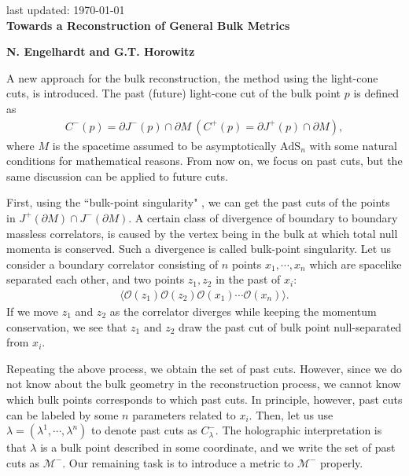 \documentclass[12pt]{article}
\date{}
\begin{document}
{\Large{}
\hfill{\normalsize last updated: \today}
\\[2mm]
\textbf{Towards a Reconstruction of General Bulk Metrics\cite{Engelhardt:2016wgb}
}
}

\noindent
\hfill
\textbf{N. Engelhardt and G.T. Horowitz}%

\vspace{12pt}
A new approach for the bulk reconstruction, the method using the light-cone cuts, is introduced.
The past (future) light-cone cut of the bulk point $p$ is defined as
\begin{align}
	C^-(p) = \partial J^-(p)\cap \partial M~(C^+(p) = \partial J^+(p)\cap \partial M),
\end{align}
where $M$ is the spacetime assumed to be asymptotically $\mathrm{AdS}_n$ with some natural conditions 
for mathematical reasons.
From now on, we focus on past cuts, but the same discussion can be applied to future cuts.

First, using the ``bulk-point singularity" \cite{Maldacena:2015iua}, we can get the past cuts of the points 
in $J^+(\partial M)\cap J^-(\partial M)$.
A certain class of divergence of boundary to boundary massless correlators,
is caused by the vertex being in the bulk at which total null momenta is conserved.
Such a divergence is called bulk-point singularity.
Let us consider a boundary correlator consisting of $n$ points $x_1,\cdots,x_n$ which are spacelike separated each other, 
and two points $z_1, z_2$ in the past of $x_i$:
\begin{align}
	\langle\mathcal O(z_1)\mathcal O(z_2)\mathcal O(x_1)\cdots\mathcal O(x_n)\rangle.
\end{align}
If we move $z_1$ and $z_2$ as the correlator diverges while keeping the momentum conservation,
we see that $z_1$ and $z_2$ draw the past cut of bulk point null-separated from $x_i$.

Repeating the above process, we obtain the set of past cuts.
However, since we do not know about the bulk geometry in the reconstruction process,
we cannot know which bulk points corresponds to which past cuts.
In principle, however, past cuts can be labeled by some $n$ parameters related to $x_i$.
Then, let us use $\lambda = (\lambda^1,\cdots,\lambda^n)$ to denote past cuts as $C^-_\lambda$.
The holographic interpretation is that $\lambda$ is a bulk point described in some coordinate,
and we write the set of past cuts as $\mathcal M^-$.
Our remaining task is to introduce a metric to $\mathcal M^-$ properly.
\end{document}
